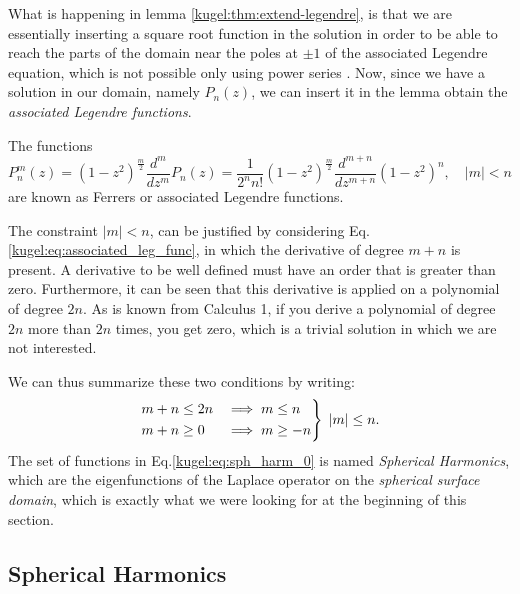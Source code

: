 What is happening in lemma \ref{kugel:thm:extend-legendre}, is that we are
essentially inserting a square root function in the solution in order to be able
to reach the parts of the domain near the poles at $\pm 1$ of the associated
Legendre equation, which is not possible only using power series
. Now, since
we have a solution in our domain, namely $P_n(z)$, we can insert it in the lemma 
obtain the \emph{associated Legendre functions}.

\begin{definition}
  \label{kugel:def:ferrers-functions}
  The functions
  \begin{equation}
    P^m_n (z) = (1-z^2)^{\frac{m}{2}}\frac{d^{m}}{dz^{m}} P_n(z)
      = \frac{1}{2^n n!}(1-z^2)^{\frac{m}{2}}\frac{d^{m+n}}{dz^{m+n}}(1-z^2)^n, \quad |m|<n
  \end{equation}
  are known as Ferrers or associated Legendre functions.
\end{definition}
The constraint $|m|<n$, can be justified by considering Eq.\eqref{kugel:eq:associated_leg_func}, in which the derivative of degree $m+n$ is present. A derivative to be well defined must have an order that is greater than zero. Furthermore, it can be seen that this derivative is applied on a polynomial of degree $2n$. As is known from Calculus 1, if you derive a polynomial of degree $2n$ more than $2n$ times, you get zero, which is a trivial solution in which we are not interested.

We can thus summarize these two conditions by writing:
\begin{equation*}
    \begin{rcases}
        m+n \leq 2n &\implies m \leq n \\
        m+n \geq 0  &\implies  m \geq -n
    \end{rcases} \; |m| \leq n.
\end{equation*}
The set of functions in Eq.\eqref{kugel:eq:sph_harm_0} is named \emph{Spherical Harmonics}, which are the eigenfunctions of the Laplace operator on the \emph{spherical surface domain}, which is exactly what we were looking for at the beginning of this section.
\fi

\subsection{Spherical Harmonics}

